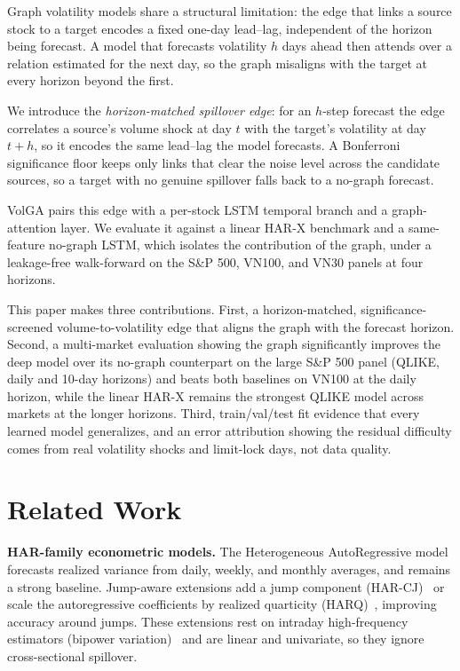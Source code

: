 \documentclass{llncs}
\begin{document}
Graph volatility models share a structural limitation: the edge that links a source stock to a target encodes a
fixed one-day lead--lag, independent of the horizon being forecast. A model that forecasts volatility $h$ days
ahead then attends over a relation estimated for the next day, so the graph misaligns with the target at every
horizon beyond the first.

We introduce the \emph{horizon-matched spillover edge}: for an $h$-step forecast the edge correlates a source's
volume shock at day $t$ with the target's volatility at day $t+h$, so it encodes the same lead--lag the model
forecasts. A Bonferroni significance floor keeps only links that clear the noise level across the candidate
sources, so a target with no genuine spillover falls back to a no-graph forecast.

VolGA pairs this edge with a per-stock LSTM temporal branch and a graph-attention layer. We evaluate it against
a linear HAR-X benchmark and a same-feature no-graph LSTM, which isolates the contribution of the graph, under a
leakage-free walk-forward on the S\&P 500, VN100, and VN30 panels at four horizons.

This paper makes three contributions. First, a horizon-matched, significance-screened volume-to-volatility edge
that aligns the graph with the forecast horizon. Second, a multi-market evaluation showing the graph
significantly improves the deep model over its no-graph counterpart on the large S\&P 500 panel (QLIKE, daily and
10-day horizons) and beats both baselines on VN100 at the daily horizon, while the linear HAR-X remains the
strongest QLIKE model across markets at the longer horizons. Third, train/val/test
fit evidence that every learned model generalizes, and an error attribution showing the residual difficulty
comes from real volatility shocks and limit-lock days, not data quality.

\section{Related Work}
\textbf{HAR-family econometric models.} The Heterogeneous AutoRegressive model~\cite{corsi2009har} forecasts
realized variance from daily, weekly, and monthly averages, and remains a strong baseline. Jump-aware extensions
add a jump component (HAR-CJ)~\cite{corsi2010threshold} or scale the autoregressive coefficients by realized
quarticity (HARQ)~\cite{bpq2016harq}, improving accuracy around jumps. These extensions rest on intraday
high-frequency estimators (bipower variation)~\cite{bns2004bipower} and are linear and univariate, so they
ignore cross-sectional spillover.
\end{document}
